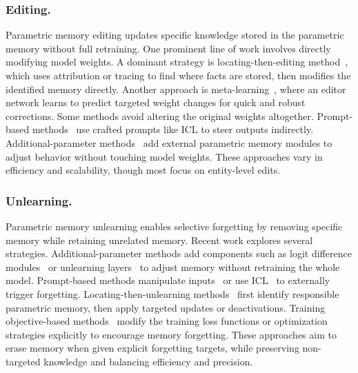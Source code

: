 \documentclass[manuscript,screen]{acmart}
\begin{document}

\subsubsection{Editing.}
Parametric memory editing updates specific knowledge stored in the parametric memory without full retraining.
One prominent line of work involves directly modifying model weights.
A dominant strategy is locating-then-editing method~\cite{meng2022locating,meng2023massediting,mela2024mass,huang2024commonsense,fang2025alphaedit,guo2025towards,deng2025everything}, which uses attribution or tracing to find where facts are stored, then modifies the identified memory directly.
Another approach is meta-learning~\cite{de2021editing,mitchell2022fast,tan2024massive,li2024pmet,zhang2024dafnet,guo2025towards}, where an editor network learns to predict targeted weight changes for quick and robust corrections.
Some methods avoid altering the original weights altogether. 
Prompt-based methods~\cite{zheng2023can,zhong2023mquake} use crafted prompts like ICL to steer outputs indirectly.
Additional-parameter methods~\cite{wang2024wise,dong2022calibrating,mitchell2022memory,wang2024memoryllm,Larimar2024} add external parametric memory modules to adjust behavior without touching model weights.
These approaches vary in efficiency and scalability, though most focus on entity-level edits.

\subsubsection{Unlearning.}
Parametric memory unlearning enables selective forgetting by removing specific memory while retaining unrelated memory.
Recent work explores several strategies.
Additional-parameter methods add components such as logit difference modules~\cite{ji2024reversing} or unlearning layers~\cite{chen2023unlearn} to adjust memory without retraining the whole model. 
Prompt-based methods manipulate inputs~\cite{liu2024large} or use ICL~\cite{pawelczyk2024context} to externally trigger forgetting.
Locating-then-unlearning methods~\cite{jia2024wagle, tian2024forget, wu2023depn} first identify responsible parametric memory, then apply targeted updates or deactivations.
Training objective-based methods~\cite{wang2025llm, liu2024towards,jia2024soul, yao2024large} modify the training loss functions or optimization strategies explicitly to encourage memory forgetting.
These approaches aim to erase memory when given explicit forgetting targets, while preserving non-targeted knowledge and balancing efficiency and precision.
\end{document}
